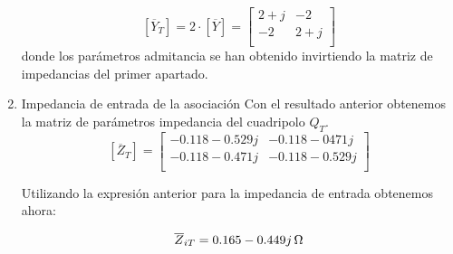 \documentclass[12pt]{article}
\begin{document}
\begin{enumerate}
  \[
    [\overline{Y}_T] = 2 \cdot [\overline{Y}] =
      \left[
    \begin{array}{cc}
      2 + j & -2\\
      -2 & 2 + j\\
    \end{array}
  \right]
  \]
donde los parámetros admitancia se han obtenido invirtiendo la matriz de impedancias del primer apartado.
\item Impedancia de entrada de la asociación
  Con el resultado anterior obtenemos la matriz de parámetros impedancia del cuadripolo $Q_T$.
  \[
    [\overline{Z}_T] = 
      \left[
    \begin{array}{cc}
      -0.118 - 0.529j & -0.118 - 0471j\\
      -0.118 - 0.471j & -0.118 - 0.529j\\
    \end{array}
  \right]
  \]

  Utilizando la expresión anterior para la impedancia de entrada obtenemos ahora:

  \[
    \overline{Z}_{iT} = \SI[parse-numbers=false]{0.165 - 0.449j}{\ohm}
  \]
  
\end{enumerate}
\end{document}
